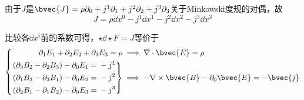 由于$J$是$\bvec{J}=\rho\partial_0+j^1\partial_1+j^2\partial_2+j^3\partial_3$关于Minkowski度规的对偶，故
\begin{equation}
J = \rho\dd x^0 - j^1\dd x^1 - j^2\dd x^2 - j^3\dd x^3
\end{equation}

比较各$\dd x^i$前的系数可得，$\star \dd \star F = J$等价于
\begin{equation}
\left\{
\begin{aligned}
\partial_1E_1+\partial_2E_2+\partial_3E_3 = \rho&\implies \nabla\cdot \bvec{E}=\rho\\
\left.
\begin{aligned}
(\partial_3B_2-\partial_2B_3)-\partial_0E_1 ={}& -j^1\\
(\partial_1B_3-\partial_3B_1)-\partial_0E_2 ={}& -j^2\\
(\partial_2B_1-\partial_1B_2)-\partial_0E_3 ={}& -j^3
\end{aligned}
\right\}&
\implies -\nabla\times \bvec{B}-\partial_0\bvec{E}=-\bvec{j}
\end{aligned}
\right. 
\end{equation}

















